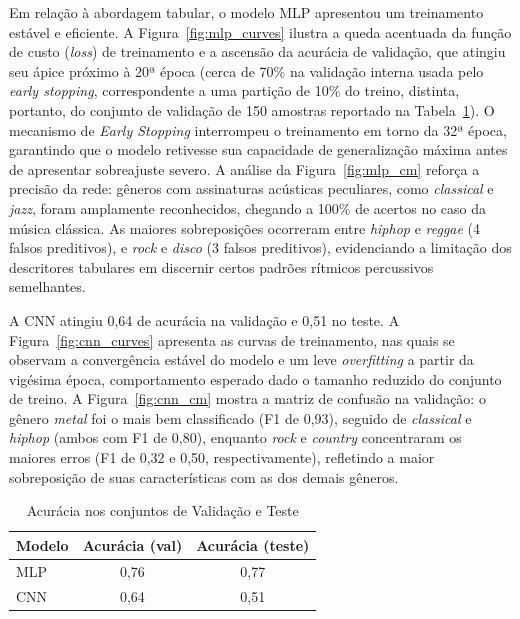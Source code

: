\documentclass[conference]{IEEEtran}
\begin{document}
	Em relação à abordagem tabular, o modelo MLP apresentou um treinamento estável e eficiente. A Figura~\ref{fig:mlp_curves} ilustra a queda acentuada da função de custo (\textit{loss}) de treinamento e a ascensão da acurácia de validação, que atingiu seu ápice próximo à 20ª época (cerca de 70\% na validação interna usada pelo \textit{early stopping}, correspondente a uma partição de 10\% do treino, distinta, portanto, do conjunto de validação de 150 amostras reportado na Tabela~\ref{tab:resultados}). O mecanismo de \textit{Early Stopping} interrompeu o treinamento em torno da 32ª época, garantindo que o modelo retivesse sua capacidade de generalização máxima antes de apresentar sobreajuste severo. A análise da Figura~\ref{fig:mlp_cm} reforça a precisão da rede: gêneros com assinaturas acústicas peculiares, como \textit{classical} e \textit{jazz}, foram amplamente reconhecidos, chegando a 100\% de acertos no caso da música clássica. As maiores sobreposições ocorreram entre \textit{hiphop} e \textit{reggae} (4 falsos preditivos), e \textit{rock} e \textit{disco} (3 falsos preditivos), evidenciando a limitação dos descritores tabulares em discernir certos padrões rítmicos percussivos semelhantes.
	
	A CNN atingiu 0,64 de acurácia na validação e 0,51 no teste. A Figura~\ref{fig:cnn_curves} apresenta as curvas de treinamento, nas quais se observam a convergência estável do modelo e um leve \textit{overfitting} a partir da vigésima época, comportamento esperado dado o tamanho reduzido do conjunto de treino. A Figura~\ref{fig:cnn_cm} mostra a matriz de confusão na validação: o gênero \textit{metal} foi o mais bem classificado (F1 de 0,93), seguido de \textit{classical} e \textit{hiphop} (ambos com F1 de 0,80), enquanto \textit{rock} e \textit{country} concentraram os maiores erros (F1 de 0,32 e 0,50, respectivamente), refletindo a maior sobreposição de suas características com as dos demais gêneros.
	
	\begin{table}[htbp]
		\centering
		\caption{Acurácia nos conjuntos de Validação e Teste}
		\label{tab:resultados}
		\begin{tabular}{lcc}
			\toprule
			\textbf{Modelo} & \textbf{Acurácia (val)} & \textbf{Acurácia (teste)} \\
			\midrule
			MLP  & 0,76 & 0,77 \\
			CNN  & 0,64 & 0,51 \\
			\bottomrule
		\end{tabular}
	\end{table}
	
\end{document}
